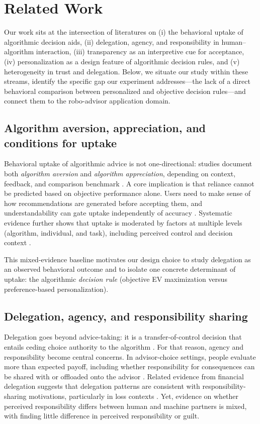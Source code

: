 \documentclass[a4paper, 12pt, fleqn]{article}
\theoremstyle{definition}
\begin{document}
\section{Related Work}
\label{sec:related}

Our work sits at the intersection of literatures on (i) the behavioral uptake of algorithmic decision aids, (ii) delegation, agency, and responsibility in human--algorithm interaction, (iii) transparency as an interpretive cue for acceptance, (iv) personalization as a design feature of algorithmic decision rules, and (v) heterogeneity in trust and delegation. Below, we situate our study within these streams, identify the specific gap our experiment addresses---the lack of a direct behavioral comparison between personalized and objective decision rules---and connect them to the robo-advisor application domain.

\subsection{Algorithm aversion, appreciation, and conditions for uptake}
Behavioral uptake of algorithmic advice is not one-directional: studies document both \emph{algorithm aversion} and \emph{algorithm appreciation}, depending on context, feedback, and comparison benchmark \citep{Dietvorst2018,Logg2019}. A core implication is that reliance cannot be predicted based on objective performance alone. Users need to make sense of how recommendations are generated before accepting them, and understandability can gate uptake independently of accuracy \citep{Yeomans2019}. Systematic evidence further shows that uptake is moderated by factors at multiple levels (algorithm, individual, and task), including perceived control and decision context \citep{Mahmud2022,Chugunova2022}.

This mixed-evidence baseline motivates our design choice to study delegation as an observed behavioral outcome and to isolate one concrete determinant of uptake: the algorithmic \emph{decision rule} (objective EV maximization versus preference-based personalization).

\subsection{Delegation, agency, and responsibility sharing}
Delegation goes beyond advice-taking: it is a transfer-of-control decision that entails ceding choice authority to the algorithm \citep{Candrian2022}. For that reason, agency and responsibility become central concerns. In advisor-choice settings, people evaluate more than expected payoff, including whether responsibility for consequences can be shared with or offloaded onto the advisor \citep{Gazit2023}. Related evidence from financial delegation suggests that delegation patterns are consistent with responsibility-sharing motivations, particularly in loss contexts \citep{Werner2026}. Yet, evidence on whether perceived responsibility differs between human and machine partners is mixed, with \citet{Kirchkamp2019} finding little difference in perceived responsibility or guilt.
\end{document}
